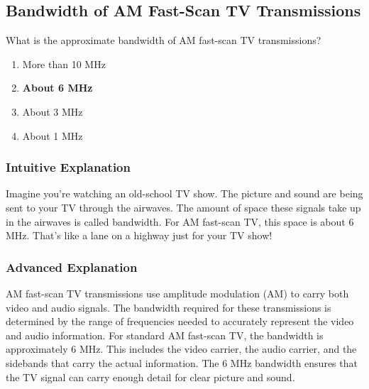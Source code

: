 \subsection{Bandwidth of AM Fast-Scan TV Transmissions}
\label{T8A10}

\begin{tcolorbox}[colback=gray!10!white,colframe=black!75!black,title=T8A10]
What is the approximate bandwidth of AM fast-scan TV transmissions?
\begin{enumerate}[noitemsep]
    \item More than 10 MHz
    \item \textbf{About 6 MHz}
    \item About 3 MHz
    \item About 1 MHz
\end{enumerate}
\end{tcolorbox}

\subsubsection*{Intuitive Explanation}
Imagine you're watching an old-school TV show. The picture and sound are being sent to your TV through the airwaves. The amount of space these signals take up in the airwaves is called bandwidth. For AM fast-scan TV, this space is about 6 MHz. That's like a lane on a highway just for your TV show!

\subsubsection*{Advanced Explanation}
AM fast-scan TV transmissions use amplitude modulation (AM) to carry both video and audio signals. The bandwidth required for these transmissions is determined by the range of frequencies needed to accurately represent the video and audio information. For standard AM fast-scan TV, the bandwidth is approximately 6 MHz. This includes the video carrier, the audio carrier, and the sidebands that carry the actual information. The 6 MHz bandwidth ensures that the TV signal can carry enough detail for clear picture and sound.